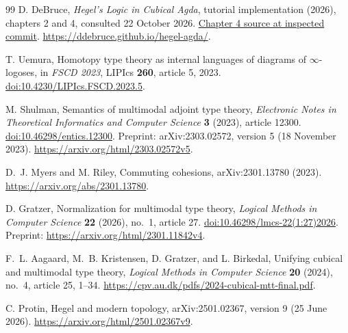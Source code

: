 \begin{thebibliography}{99}
D. DeBruce, \emph{Hegel's Logic in Cubical Agda}, tutorial implementation
(2026), chapters 2 and 4, consulted 22 October 2026.
\href{https://github.com/ddebruce/hegel-agda/blob/40cf024b731494db806801dcf0948b2f65d52331/book/src/ch04-unity-aufhebung.lagda.md}{Chapter 4 source at inspected commit}.
\url{https://ddebruce.github.io/hegel-agda/}.

T. Uemura, Homotopy type theory as internal languages of diagrams of
$\infty$-logoses, in \emph{FSCD 2023}, LIPIcs \textbf{260}, article 5,
2023. \href{https://doi.org/10.4230/LIPIcs.FSCD.2023.5}{doi:10.4230/LIPIcs.FSCD.2023.5}.

M. Shulman, Semantics of multimodal adjoint type theory,
\emph{Electronic Notes in Theoretical Informatics and Computer
Science} \textbf{3} (2023), article 12300.
\href{https://doi.org/10.46298/entics.12300}{doi:10.46298/entics.12300}.
Preprint: arXiv:2303.02572, version 5 (18 November 2023).
\url{https://arxiv.org/html/2303.02572v5}.

D.~J. Myers and M. Riley, Commuting cohesions, arXiv:2301.13780
(2023). \url{https://arxiv.org/abs/2301.13780}.

D. Gratzer, Normalization for multimodal type theory,
\emph{Logical Methods in Computer Science} \textbf{22} (2026),
no.~1, article 27.
\href{https://doi.org/10.46298/lmcs-22(1:27)2026}{doi:10.46298/lmcs-22(1:27)2026}.
Preprint: \url{https://arxiv.org/html/2301.11842v4}.

F.~L. Aagaard, M.~B. Kristensen, D. Gratzer, and L. Birkedal,
Unifying cubical and multimodal type theory, \emph{Logical Methods in
Computer Science} \textbf{20} (2024), no.~4, article 25, 1--34.
\url{https://cpv.au.dk/pdfs/2024-cubical-mtt-final.pdf}.

C. Protin, Hegel and modern topology, arXiv:2501.02367,
version 9 (25 June 2026).
\url{https://arxiv.org/html/2501.02367v9}.

\end{thebibliography}
\endgroup
